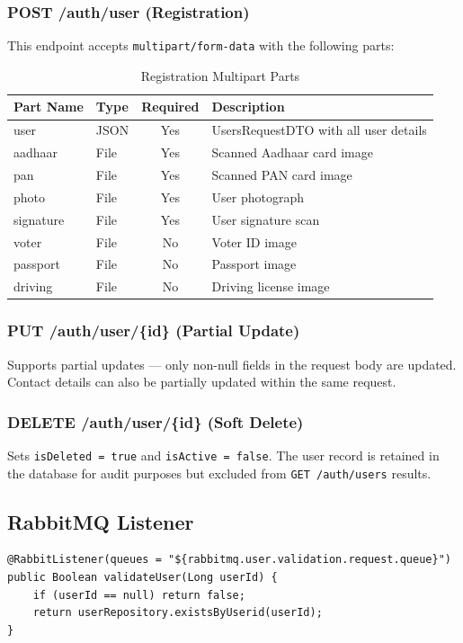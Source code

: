 \documentclass[12pt,a4paper]{report}
\begin{document}
\subsubsection{POST /auth/user (Registration)}
This endpoint accepts \texttt{multipart/form-data} with the following parts:

\begin{table}[H]
\centering
\caption{Registration Multipart Parts}
\begin{tabularx}{\textwidth}{llcX}
\toprule
\textbf{Part Name} & \textbf{Type} & \textbf{Required} & \textbf{Description} \\
\midrule
user & JSON & Yes & UsersRequestDTO with all user details \\
aadhaar & File & Yes & Scanned Aadhaar card image \\
pan & File & Yes & Scanned PAN card image \\
photo & File & Yes & User photograph \\
signature & File & Yes & User signature scan \\
voter & File & No & Voter ID image \\
passport & File & No & Passport image \\
driving & File & No & Driving license image \\
\bottomrule
\end{tabularx}
\end{table}

\subsubsection{PUT /auth/user/\{id\} (Partial Update)}
Supports partial updates --- only non-null fields in the request body are updated. Contact details can also be partially updated within the same request.

\subsubsection{DELETE /auth/user/\{id\} (Soft Delete)}
Sets \texttt{isDeleted = true} and \texttt{isActive = false}. The user record is retained in the database for audit purposes but excluded from \texttt{GET /auth/users} results.

\subsection{RabbitMQ Listener}
\begin{lstlisting}[style=javastyle, caption={User Validation Listener}]
@RabbitListener(queues = "${rabbitmq.user.validation.request.queue}")
public Boolean validateUser(Long userId) {
    if (userId == null) return false;
    return userRepository.existsByUserid(userId);
}
\end{lstlisting}
\end{document}
